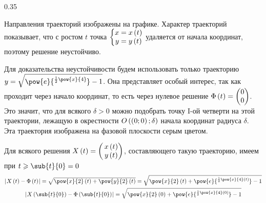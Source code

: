 \documentclass[a5paper,10pt]{article}
\begin{document}
\begin{floatingfigure}{0.35\textwidth}
\end{floatingfigure}

Направления траекторий изображены на графике. Характер траекторий показывает, что с ростом $t$ точка
$\left\{ \begin{matrix} x = x\left(\hspace{0.01em}t\hspace{0.01em}\right) \\ y = y\left(\hspace{0.01em}t\hspace{0.01em}\right)\end{matrix} \right.$
удаляется от начала координат, поэтому решение неустойчиво.

Для доказательства неустойчивости будем использовать только траекторию 
$y = \sqrt{\pow{e}{\selevate[0.4em]{\frac {1}{2} \pow{x}{4}}} - 1}$.
Она представляет особый интерес, так как проходит через начало координат,
то есть через нулевое решение \linebreak
$\Phi\left(\hspace{0.01em}t\hspace{0.01em}\right) = \begin{pmatrix} 0 \\ 0 \end{pmatrix}$. 
Это значит, что для всякого $\delta > 0$ 
можно подобрать точку I-ой четверти на этой траектории, лежащую в окрестности 
$O\left(\hspace{0.01em}\left(\hspace{0.01em}0; 0\hspace{0.01em}\right); \delta\hspace{0.01em}\right)$ начала координат радиуса $\delta$.
Эта траектория изображена на фазовой плоскости серым цветом.

Для всякого решения $X\left(\hspace{0.01em}t\hspace{0.01em}\right) = \begin{pmatrix} \,x\left(\hspace{0.01em}t\hspace{0.01em}\right) \\ \,y\left(\hspace{0.01em}t\hspace{0.01em}\right) \end{pmatrix}$,
составляющего такую траекторию, имеем при $t \ge \sub{t}{0} = 0$
\begin{gather*}
    \vbr{X\br{t} - \Phi\br{t}}
        = \textstyle\sqrt{\pow{x}{2}\br{t} + \pow{y}{2}\br{t}}
        = \sqrt{\pow{x}{2}\br{t} 
            + \pow{e}{\selevate[0.4em]{\frac {1}{2} \pow{x}{4}\br{t}}} - 1} \\
    \vbr{X\br{\sub{t}{0}} - \Phi\br{\sub{t}{0}}}
        = \sqrt{\pow{x}{2}\br{0} 
            + \pow{e}{\selevate[0.4em]{\frac {1}{2} \pow{x}{4}\br{0}}} - 1}
\end{gather*}
\end{document}
